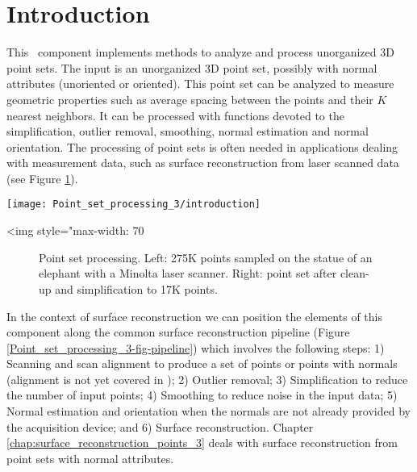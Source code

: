 \section{Introduction}

This \cgal\ component implements methods to analyze and process unorganized 3D point sets. The input is an unorganized 3D point set, possibly with normal attributes (unoriented or oriented). This point set can be analyzed to measure geometric properties such as average spacing between the points and their $K$ nearest neighbors. It can be processed with functions devoted to the simplification, outlier removal, smoothing, normal estimation and normal orientation. The processing of point sets is often needed in applications dealing with measurement data, such as surface reconstruction from laser scanned data (see Figure \ref{Point_set_processing_3-fig-introduction}).

\begin{center}
    \begin{ccTexOnly}
        \texttt{[image: Point\_set\_processing\_3/introduction]} %
    \end{ccTexOnly}
    \begin{ccHtmlOnly}
        <img style="max-width: 70%
    \end{ccHtmlOnly}
    \begin{figure}[h]
        \caption{Point set processing.
                 Left: 275K points sampled on the statue of
                 an elephant with a Minolta laser scanner.
                 Right: point set after clean-up and
                 simplification to 17K points.}
        \label{Point_set_processing_3-fig-introduction}
    \end{figure}
\end{center}

In the context of surface reconstruction we can position the elements of this component along the common surface reconstruction pipeline (Figure \ref{Point_set_processing_3-fig-pipeline}) which involves the following steps: 1) Scanning and scan alignment to produce a set of points or points with normals (alignment is not yet covered in \cgal); 2) Outlier removal; 3) Simplification to reduce the number of input points; 4) Smoothing to reduce noise in the input data; 5) Normal estimation and orientation when the normals are not already provided by the acquisition device; and 6) Surface reconstruction. Chapter  \ref{chap:surface_reconstruction_points_3} deals with surface reconstruction from point sets with normal attributes.

